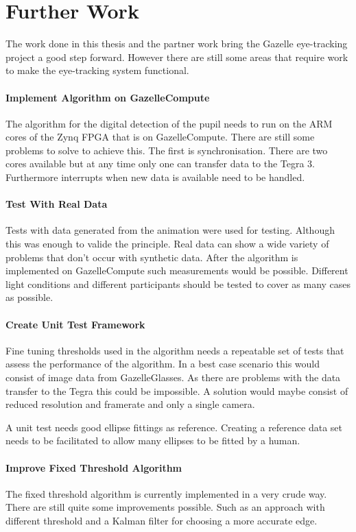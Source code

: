 \chapter{Further Work}
\label{chap:outlook}
The work done in this thesis and the partner work bring the Gazelle eye-tracking project a good step forward. However there are still some areas that require work to make the eye-tracking system functional.

\subsubsection{Implement Algorithm on GazelleCompute}

The algorithm for the digital detection of the pupil needs to run on the ARM cores of the Zynq FPGA that is on GazelleCompute. There are still some problems to solve to achieve this. The first is synchronisation. There are two cores available but at any time only one can transfer data to the Tegra 3. Furthermore interrupts when new data is available need to be handled.

\subsubsection{Test With Real Data} 

Tests with data generated from the animation were used for testing. Although this was enough to valide the principle. Real data can show a wide variety of problems that don't occur with synthetic data. After the algorithm is implemented on GazelleCompute such measurements would be possible. Different light conditions and different participants should be tested to cover as many cases as possible.

\subsubsection{Create Unit Test Framework}

Fine tuning thresholds used in the algorithm needs a repeatable set of tests that assess the performance of the algorithm. In a best case scenario this would consist of image data from GazelleGlasses. As there are problems with the data transfer to the Tegra this could be impossible. A solution would maybe consist of reduced resolution and framerate and only a single camera. 

A unit test needs good ellipse fittings as reference. Creating a reference data set needs to be facilitated to allow many ellipses to be fitted by a human. 

\subsubsection{Improve Fixed Threshold Algorithm}

 The fixed threshold algorithm is currently implemented in a very crude way. There are still quite some improvements possible. Such as an approach with different threshold and a Kalman filter for choosing a more accurate edge.